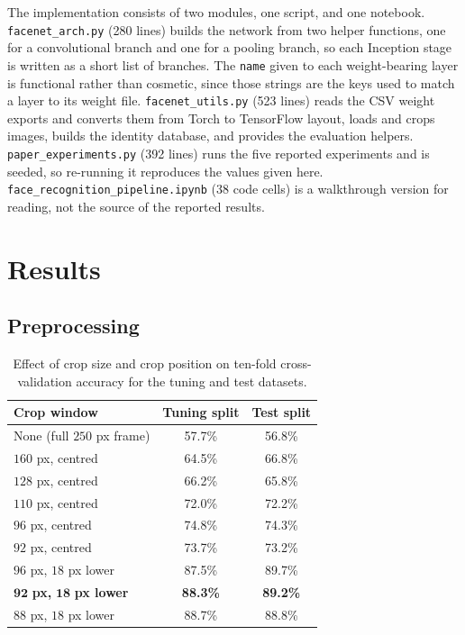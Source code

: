 \documentclass[conference]{IEEEtran}
\begin{document}
The implementation consists of two modules, one script, and one notebook.
\texttt{facenet\_arch.py} (280 lines) builds the network from two helper functions,
one for a convolutional branch and one for a pooling branch, so each Inception
stage is written as a short list of branches. The \texttt{name} given to each
weight-bearing layer is functional rather than cosmetic, since those strings are
the keys used to match a layer to its weight file.
\texttt{facenet\_utils.py} (523 lines) reads the CSV weight exports and converts
them from Torch to TensorFlow layout, loads and crops images, builds the identity
database, and provides the evaluation helpers.
\texttt{paper\_experiments.py} (392 lines) runs the five reported experiments and
is seeded, so re-running it reproduces the values given here.
\texttt{face\_recognition\_pipeline.ipynb} (38 code cells) is a walkthrough version
for reading, not the source of the reported results.

\section{Results}

\subsection{Preprocessing}
\label{sec:prep}

\begin{table}[!t]
\caption{Effect of crop size and crop position on ten-fold cross-validation accuracy for the tuning and test datasets.}
\label{tab:crop}
\centering
\begin{tabular}{lcc}
\toprule
Crop window & Tuning split & Test split \\
\midrule
None (full $250$ px frame) & 57.7\% & 56.8\% \\
$160$ px, centred          & 64.5\% & 66.8\% \\
$128$ px, centred          & 66.2\% & 65.8\% \\
$110$ px, centred          & 72.0\% & 72.2\% \\
$96$ px, centred           & 74.8\% & 74.3\% \\
$92$ px, centred           & 73.7\% & 73.2\% \\
$96$ px, $18$ px lower     & 87.5\% & 89.7\% \\
$\mathbf{92}$ \textbf{px,} $\mathbf{18}$ \textbf{px lower} & \textbf{88.3\%} & \textbf{89.2\%} \\
$88$ px, $18$ px lower     & 88.7\% & 88.8\% \\
\bottomrule
\end{tabular}
\end{table}
\end{document}
